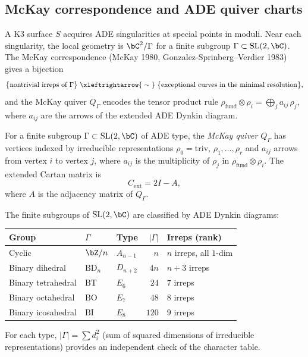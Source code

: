 \subsection{McKay correspondence and ADE quiver charts}
\label{sec:ade-yangian-level1}

A K3 surface $S$ acquires ADE singularities at special points in
moduli. Near each singularity, the local geometry is
$\bC^2/\Gamma$ for a finite subgroup $\Gamma \subset \mathrm{SL}(2,\bC)$.
The McKay correspondence (McKay 1980, Gonzalez-Sprinberg--Verdier
1983) gives a bijection
\[
\bigl\{\text{nontrivial irreps of } \Gamma\bigr\}
\;\xleftrightarrow{\;\sim\;}\;
\bigl\{\text{exceptional curves in the minimal resolution}\bigr\},
\]
and the McKay quiver $Q_\Gamma$ encodes the tensor product rule
$\rho_{\mathrm{fund}} \otimes \rho_i = \bigoplus_j a_{ij}\,\rho_j$,
where $a_{ij}$ are the arrows of the extended ADE Dynkin diagram.

\begin{definition}
\label{def:mckay-quiver}
For a finite subgroup $\Gamma \subset \mathrm{SL}(2,\bC)$ of ADE
type, the \emph{McKay quiver} $Q_\Gamma$ has vertices indexed by
irreducible representations $\rho_0 = \mathrm{triv},\,
\rho_1,\ldots,\rho_r$ and $a_{ij}$ arrows from vertex $i$ to
vertex $j$, where $a_{ij}$ is the multiplicity of $\rho_j$ in
$\rho_{\mathrm{fund}} \otimes \rho_i$. The extended Cartan matrix is
\[
C_{\mathrm{ext}} = 2I - A,
\]
where $A$ is the adjacency matrix of $Q_\Gamma$.
\end{definition}

\begin{example}
\label{ex:ade-classification}
The finite subgroups of $\mathrm{SL}(2,\bC)$ are classified by
ADE Dynkin diagrams:
\begin{center}
\small
\renewcommand{\arraystretch}{1.2}
\begin{tabular}{lllrl}
\textbf{Group} & $\Gamma$ & \textbf{Type} & $|\Gamma|$
 & \textbf{Irreps (rank)} \\
\hline
Cyclic & $\bZ/n$ & $A_{n-1}$ & $n$ & $n$ irreps, all $1$-dim \\
Binary dihedral & $\mathrm{BD}_n$ & $D_{n+2}$ & $4n$ & $n+3$ irreps \\
Binary tetrahedral & $\mathrm{BT}$ & $E_6$ & $24$ & $7$ irreps \\
Binary octahedral & $\mathrm{BO}$ & $E_7$ & $48$ & $8$ irreps \\
Binary icosahedral & $\mathrm{BI}$ & $E_8$ & $120$ & $9$ irreps
\end{tabular}
\end{center}
For each type, $|\Gamma| = \sum d_i^2$ (sum of squared dimensions
of irreducible representations) provides an independent check of
the character table.
\end{example}

